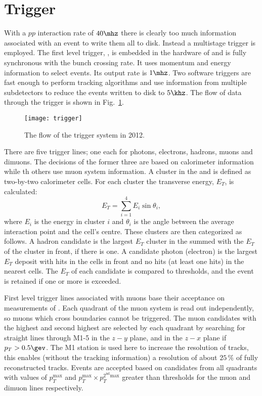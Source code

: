 \section{Trigger}

With a $pp$ interaction rate of $40\mhz$ there is clearly too much information associated with an event
to write them all to disk.
Instead a multistage trigger is employed.
The first level trigger, \lone, is embedded in the hardware of \lhcb and is fully synchronous with
the bunch crossing rate.
It uses momentum and energy information to select events.
Its output rate is $1\mhz$.
Two software triggers are fast enough to perform tracking algorithms and use information from
multiple subdetectors to reduce the events written to disk to $5\khz$.
The flow of data through the trigger is shown in Fig.~\ref{fig:lhcb:trigger}.

\begin{figure}
  \begin{center}
    \texttt{[image: trigger]}
  \end{center}
  \caption[Trigger sequence]
  {\small
    The flow of the \lhcb trigger system in 2012.
  }
  \label{fig:lhcb:trigger}
\end{figure}

There are five \lone trigger lines; one each for photons, electrons, hadrons, muons and dimuons.
The decisions of the former three are based on calorimeter information while th others use muon
system information.
A cluster in the \ecal and \hcal is defined as two-by-two calorimeter cells.
For each cluster the transverse energy, $E_T$, is calculated:
\begin{equation}
  E_T = \sum_{i=1}^4E_i\sin\theta_i,
\end{equation}
where $E_i$ is the energy in cluster $i$ and $\theta_i$ is the angle between the average
interaction point and the cell's centre.
These clusters are then categorized as follows.
A hadron candidate is the largest $E_T$ cluster in the \hcal summed with the $E_T$ of the \ecal
cluster in front, if there is one.
A candidate photon (electron) is the largest $E_T$ deposit with hits in the \presh cells in front and
no hits (at least one hits) in the nearest \spd cells.
The $E_T$ of each candidate is compared to thresholds, and the event is retained if one or more is
exceeded.

First level trigger lines associated with muons base their acceptance on measurements of \pt.
Each quadrant of the muon system is read out independently, so muons which cross boundaries cannot
be triggered.
The muon candidates with the highest and second highest \pt are selected by each quadrant by
searching for straight lines through M1-5 in the $z-y$ plane, and in the $z-x$ plane if
$p_T>0.5\gev$.
The M1 station is used here to increase the \pt resolution of tracks, this enables (without the
tracking information) a resolution of about $25\,\%$ of fully reconstructed tracks.
Events are accepted based on candidates from all quadrants with values of $p_T^\mathrm{max}$ and
$p_T^\mathrm{max}\times p_T^\mathrm{2^{nd} max}$ greater than thresholds for the muon and dimuon
lines respectively.

